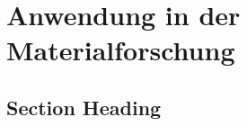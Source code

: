 \chapter{Anwendung in der Materialforschung}
\label{trends} %



\section{Section Heading}


\printbibliography
